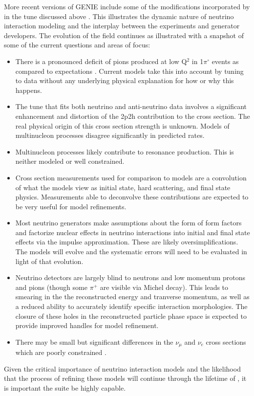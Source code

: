 More recent versions of GENIE include some of the modifications incorporated by  in the tune discussed above \cite{Alam:2015nkk}.  This illustrates the dynamic nature of neutrino interaction modeling and the interplay between the experiments and generator developers.  The evolution of the field continues as illustrated with a snapshot of some of the current questions and areas of focus:
\begin{itemize}
    \item There is a pronounced deficit of pions produced at low Q$^{2}$ in 1$\pi^{\circ}$ events as compared to expectations \cite{BercellieNUINT2018,Altinok:2017xua,Aliaga:2015wva,McGivern:2016bwh,novaminosPC}.  Current models take this into account by tuning to data without any underlying physical explanation for how or why this happens.
    \item The  tune that fits both neutrino and anti-neutrino  data involves a significant enhancement and distortion of the 2p2h contribution to the cross section.  The real physical origin of this cross section strength is unknown.  Models of multinucleon processes disagree significantly in predicted rates.
    \item Multinucleon processes likely contribute to resonance production.  This is neither modeled or well constrained.
    \item Cross section measurements used for comparison to models are a convolution of what the models view as initial state, hard scattering, and final state physics.   Measurements able to deconvolve these contributions are expected to be very useful for model refinements.  
    \item Most neutrino generators make assumptions about the form of form factors and factorize nuclear effects in neutrino interactions into initial and final state effects via the impulse approximation.  These are likely oversimplifications.  The models will evolve and the systematic errors will need to be evaluated in light of that evolution. 
    \item  Neutrino detectors are largely blind to neutrons and low momentum protons and pions (though some $\pi^{+}$ are visible via Michel decay).  This leads to smearing in the the reconstructed energy and tranverse momentum, as well as a reduced ability to accurately identify specific interaction morphologies.  The closure of these holes in the reconstructed particle phase space is expected to provide improved handles for model refinement.
    \item There may be small but significant differences in the $\nu_{\mu}$ and $\nu_{e}$  cross sections which are poorly constrained \cite{Day2012gb}.
\end{itemize}
Given the critical importance of neutrino interaction models and the likelihood that the process of refining these models will continue through the lifetime of , it is important the    suite be highly capable.   

